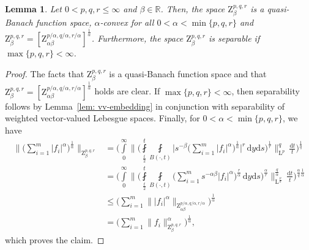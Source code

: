 \documentclass[11pt, leqno,parskip=half]{amsart}
\newtheorem{lemma}[theorem]{Lemma}
\theoremstyle{definition}
\newcommand{\IR}{\mathbb{R}}
\renewcommand{\L}{\mathrm{L}}
\newcommand{\Z}{\mathrm{Z}}
\renewcommand{\d}{\mathrm{d}}
\numberwithin{equation}{section}
\begin{document}
\begin{lemma}
\label{lem: Z-space convex}
    Let  $0< p,q, r \leq \infty$ and $\beta \in \IR$. Then, the space $\Z^{p,q,r}_\beta$ is a quasi-Banach function space, $\alpha$-convex for all $0<\alpha<\min\{p,q,r\}$ and $\Z^{p,q,r}_\beta = [\Z^{p/\alpha,q/\alpha,r/\alpha}_{\alpha\beta}]^\frac{1}{\alpha}$. Furthermore, the space $\Z^{p,q,r}_\beta$ is separable if $\max\{p,q,r\}<\infty$.
\end{lemma}

\begin{proof}
    The facts that $\Z^{p,q,r}_\beta$ is a quasi-Banach function space and that $\Z^{p,q,r}_\beta = [\Z^{p/\alpha,q/\alpha,r/\alpha}_{\alpha\beta}]^\frac{1}{\alpha}$ holds are clear. If $\max\{p,q,r\}<\infty$, then separability follows by Lemma~\ref{lem: vv-embedding} in conjunction with separability of weighted vector-valued Lebesgue spaces. Finally, for $0<\alpha<\min\{p,q,r\}$, we have
    \begin{align*}
        \Big\|\Big(\sum\limits_{i=1}^m |f_i|^\alpha \bigg)^\frac{1}{\alpha}\Big\|_{\Z^{p,q,r}_\beta} &= \bigg(\int\limits_0^\infty \bigg\|\bigg(\fint\limits_{\frac{t}{2}}^t \fint\limits_{B(\cdot,t)} \Big|s^{-\beta}\Big(\sum\limits_{i=1}^m |f_i|^\alpha\bigg)^\frac{1}{\alpha} \Big|^r\,\d y \d s \bigg)^\frac{1}{r} \bigg\|_{\L^p}^q\,\frac{\d t}{t}\bigg)^\frac{1}{q}\\
        &= \bigg(\int\limits_0^\infty \bigg\|\bigg(\fint\limits_{\frac{t}{2}}^t \fint\limits_{B(\cdot,t)} \Big(\sum\limits_{i=1}^m s^{-\alpha\beta }|f_i|^\alpha\bigg)^\frac{r}{\alpha}\,\d y \d s \bigg)^\frac{\alpha}{r} \bigg\|_{\L^{\frac{p}{\alpha}}}^\frac{q}{\alpha}\,\frac{\d t}{t}\bigg)^{\frac{\alpha}{ q} \frac{1}{\alpha}}\\
        &\leq  \Big(\sum\limits_{i=1}^m \| |f_i|^\alpha \|_{\Z^{p/\alpha, q/\alpha , r/\alpha}_{\alpha \beta}} \Big)^\frac{1}{\alpha}\\
        &=\Big(\sum\limits_{i=1}^m \| f_i\|_{\Z^{p,q,r}_{\beta}}^\alpha \Big)^\frac{1}{\alpha},
    \end{align*}
    which proves the claim.
\end{proof}
\end{document}
